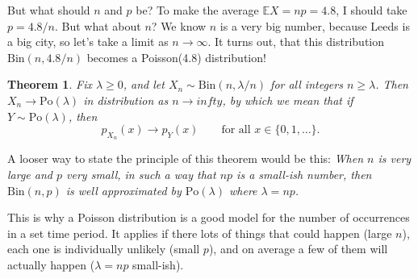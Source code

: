 \documentclass[
  a4paper,
]{book}
\newtheorem{theorem}{Theorem}[chapter]
\theoremstyle{definition}
\theoremstyle{definition}
\theoremstyle{definition}
\theoremstyle{definition}
\theoremstyle{remark}
\begin{document}
But what should \(n\) and \(p\) be? To make the average \(\mathbb EX = np = 4.8\), I should take \(p = 4.8/n\). But what about \(n\)? We know \(n\) is a very big number, because Leeds is a big city, so let's take a limit as \(n \to \infty\). It turns out, that this distribution \(\text{Bin}(n, 4.8/n)\) becomes a Poisson(4.8) distribution!

\begin{theorem}
\protect\hypertarget{thm:po-bint}{}\label{thm:po-bint}Fix \(\lambda \geq 0\), and let \(X_n \sim \text{Bin}(n, \lambda/n)\) for all integers \(n \geq \lambda\). Then \(X_n \to \text{Po}(\lambda)\) in distribution as \(n \to infty\), by which we mean that if \(Y \sim \text{Po}(\lambda)\), then
\[ p_{X_n}(x) \to p_Y(x) \qquad \text{for all $x \in \{0, 1, \dots \}$}. \]
\end{theorem}

A looser way to state the principle of this theorem would be this: \emph{When \(n\) is very large and \(p\) very small, in such a way that \(np\) is a small-ish number, then \(\text{Bin}(n,p)\) is well approximated by \(\text{Po}(\lambda)\) where \(\lambda = np\).}

This is why a Poisson distribution is a good model for the number of occurrences in a set time period. It applies if there lots of things that could happen (large \(n\)), each one is individually unlikely (small \(p\)), and on average a few of them will actually happen (\(\lambda = np\) small-ish).
\end{document}
